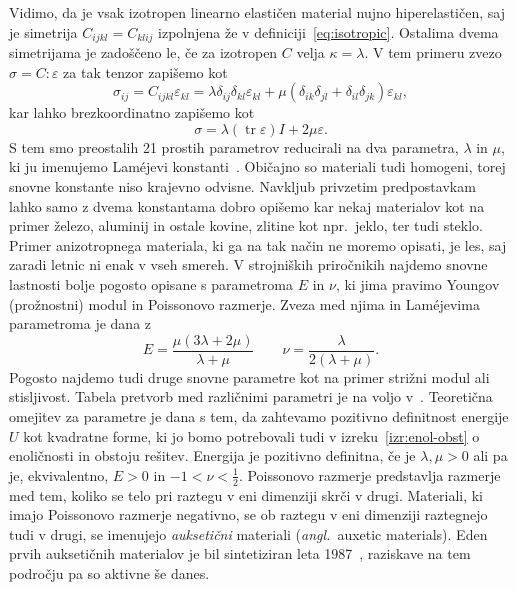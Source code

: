 \documentclass[12pt,a4paper,twoside]{article}
\theoremstyle{definition} %
\theoremstyle{plain} %
\numberwithin{equation}{section}
\newcommand{\eps}{\varepsilon}
\newcommand{\ts}{\sigma}
\DeclareMathOperator{\tr}{tr}
\newcommand{\ang}[1]{(\textit{angl.}\ #1)}
\begin{document}
Vidimo, da je vsak izotropen linearno elastičen material nujno hiperelastičen, saj je simetrija
$C_{ijkl} = C_{klij}$ izpolnjena že v definiciji~\eqref{eq:isotropic}.  Ostalima dvema simetrijama
je zadoščeno le, če za izotropen $C$ velja $\kappa = \lambda$.
V tem primeru zvezo $\ts = C:\eps$ za tak tenzor zapišemo kot
\begin{equation}
  \sigma_{ij} = C_{ijkl}\eps_{kl} = \lambda \delta_{ij}\delta_{kl} \eps_{kl} +
  \mu(\delta_{ik}\delta_{jl} + \delta_{il}\delta_{jk})\eps_{kl},
\end{equation}
kar lahko brezkoordinatno zapišemo kot
\begin{equation}
  \ts = \lambda (\tr\eps)I + 2\mu \eps.
  \label{eq:hooke-isotropic}
\end{equation}
S tem smo preostalih 21 prostih parametrov reducirali na dva parametra, $\lambda$ in $\mu$, ki ju
imenujemo Lam\'{e}jevi konstanti~\cite[str.\ 211]{slaughter2012linearized}.  Običajno so materiali
tudi homogeni, torej snovne konstante niso krajevno odvisne.  Navkljub privzetim predpostavkam lahko
samo z dvema konstantama dobro opišemo kar nekaj materialov kot na primer železo, aluminij in ostale
kovine, zlitine kot npr.~jeklo, ter tudi steklo.  Primer anizotropnega materiala, ki ga na tak način
ne moremo opisati, je les, saj zaradi letnic ni enak v vseh smereh.  V strojniških priročnikih
najdemo snovne lastnosti bolje pogosto opisane s parametroma $E$ in $\nu$, ki jima pravimo Youngov
(prožnostni) modul in Poissonovo razmerje. Zveza med njima in Lam\'{e}jevima parametroma je dana z
\begin{equation}
   E = \frac{\mu(3\lambda+2\mu)}{\lambda+\mu} \qquad \nu = \frac{\lambda}{2(\lambda+\mu)}.
\end{equation}
Pogosto najdemo tudi druge snovne parametre kot na primer strižni modul ali stisljivost. Tabela
pretvorb med različnimi parametri je na voljo v~\cite[tabela 5.1,
str.~215]{slaughter2012linearized}. Teoretična omejitev za parametre je dana s tem, da zahtevamo
pozitivno definitnost energije $U$ kot kvadratne forme, ki jo bomo potrebovali tudi v
izreku~\ref{izr:enol-obst} o enoličnosti in obstoju rešitev. Energija je pozitivno definitna,
če je $\lambda, \mu > 0$ ali pa je, ekvivalentno, $E > 0$ in $-1 < \nu < \frac12$.
Poissonovo razmerje predstavlja razmerje med tem, koliko se telo pri raztegu v eni dimenziji
skrči v drugi. Materiali, ki imajo Poissonovo razmerje negativno, se ob raztegu v eni dimenziji
raztegnejo tudi v drugi, se imenujejo \emph{auksetični} materiali \ang{auxetic materials}.
Eden prvih auksetičnih materialov je bil sintetiziran leta 1987~\cite{lakes1987foam}, raziskave na
tem področju pa so aktivne še danes.
\end{document}

